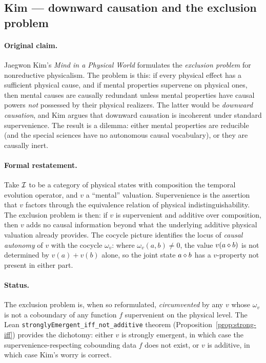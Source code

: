 \subsection{Kim --- downward causation and the exclusion problem}
\label{sec:zoo:kim}

\paragraph{Original claim.} Jaegwon Kim's \emph{Mind in a Physical World}
\cite{Kim1998} formulates the \emph{exclusion problem} for nonreductive
physicalism. The problem is this: if every physical effect has a sufficient
physical cause, and if mental properties supervene on physical ones, then
mental causes are causally redundant unless mental properties have causal
powers \emph{not} possessed by their physical realizers. The latter would be
\emph{downward causation}, and Kim argues that downward causation is
incoherent under standard supervenience. The result is a dilemma: either
mental properties are reducible (and the special sciences have no
autonomous causal vocabulary), or they are causally inert.

\paragraph{Formal restatement.} Take $\mathcal{I}$ to be a category of physical
states with composition the temporal evolution operator, and $v$ a
``mental'' valuation. Supervenience is the assertion that $v$ factors through
the equivalence relation of physical indistinguishability. The exclusion
problem is then: if $v$ is supervenient and additive over composition, then
$v$ adds no causal information beyond what the underlying additive physical
valuation already provides. The cocycle picture identifies the locus of
\emph{causal autonomy} of $v$ with the cocycle $\omega_v$: where
$\omega_v(a,b) \ne 0$, the value $v(a\mathbin{\diamond} b)$ is not determined by
$v(a) + v(b)$ alone, so the joint state $a\mathbin{\diamond} b$ has a $v$-property
not present in either part.

\paragraph{Status.} The exclusion problem is, when so reformulated,
\emph{circumvented} by any $v$ whose $\omega_v$ is not a coboundary of any
function $f$ supervenient on the physical level. The Lean
\texttt{stronglyEmergent\_iff\_not\_additive} theorem
(Proposition~\ref{prop:strong-iff}) provides the dichotomy: either $v$ is
strongly emergent, in which case the supervenience-respecting cobounding
data $f$ does not exist, or $v$ is additive, in which case Kim's worry is
correct.

